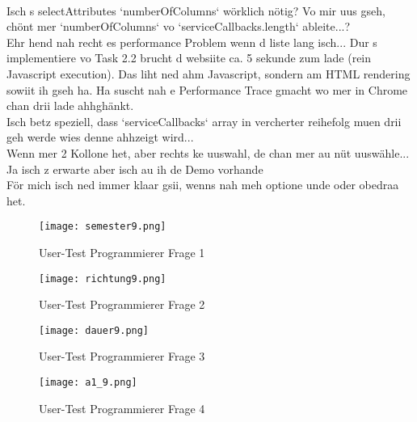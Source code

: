  \\

Isch s selectAttributes `numberOfColumns` wörklich nötig? 
Vo mir uus gseh, chönt mer `numberOfColumns` vo `serviceCallbacks.length` ableite...? 
\\ Ehr hend nah recht es performance Problem wenn d liste lang isch... 
Dur s implementiere vo Task 2.2 brucht d websiite ca. 5 sekunde zum lade (rein Javascript execution). 
Das liht ned ahm Javascript, sondern am HTML rendering sowiit ih gseh ha. 
Ha suscht nah e Performance Trace gmacht wo mer in Chrome chan drii lade ahhghänkt. 
\\ Isch betz speziell, dass `serviceCallbacks` array in vercherter reihefolg muen drii geh werde wies denne ahhzeigt wird... 
\\ Wenn mer 2 Kollone het, aber rechts ke uuswahl, de chan mer au nüt uuswähle... 
Ja isch z erwarte aber isch au ih de Demo vorhande 
\\ För mich isch ned immer klaar gsii, wenns nah meh optione unde oder obedraa het. 


\graphicspath{ {./img/userTests/} }
\begin{figure}[!p]
    \centering
    \begin{minipage}[b]{0.6\textwidth}
        \centering
        \texttt{[image: semester9.png]}
        \caption{\centering User-Test Programmierer Frage 1}
        \label{img:userTestSemester}
    \end{minipage}
    \begin{minipage}[b]{0.6\textwidth}
        \centering
        \texttt{[image: richtung9.png]}
        \caption{\centering User-Test Programmierer Frage 2}
        \label{img:userTestStudy}
    \end{minipage}
    \begin{minipage}[b]{0.6\textwidth}
        \centering
        \texttt{[image: dauer9.png]}
        \caption{\centering User-Test Programmierer Frage 3}
        \label{img:userTestDuration}
    \end{minipage}
    \begin{minipage}[b]{0.6\textwidth}
        \centering
        \texttt{[image: a1\_9.png]}
        \caption{\centering User-Test Programmierer Frage 4}
        \label{img:userTestA1}
    \end{minipage}
\end{figure}

